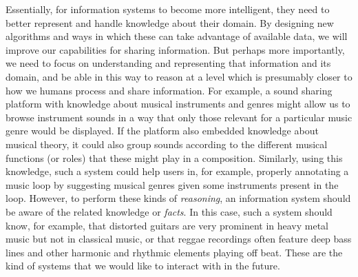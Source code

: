 Essentially, for information systems to become more intelligent, they need to better represent and handle knowledge about their domain.
By designing new algorithms and ways in which these can take advantage of available data, we will improve our capabilities for sharing information. 
But perhaps more importantly, we need to focus on understanding and representing that information and its domain, and be able in this way to reason at a level which is presumably closer to how we humans process and share information.
For example, a sound sharing platform with knowledge about musical instruments and genres might allow us to browse instrument sounds in a way that only those relevant for a particular music genre would be displayed. If the platform also embedded knowledge about musical theory, it could also group sounds according to the different musical functions (or roles) that these might play in a composition. Similarly, using this knowledge, such a system could help users in, for example, properly annotating a music loop by suggesting musical genres given some instruments present in the loop.
However, to perform these kinds of \emph{reasoning}, an information system should be aware of the related knowledge or \emph{facts}.
In this case, such a system should know, for example, that distorted guitars are very prominent in heavy metal music but not in classical music, or that reggae recordings often feature deep bass lines and other harmonic and rhythmic elements playing off beat.
These are the kind of systems that we would like to interact with in the future.


